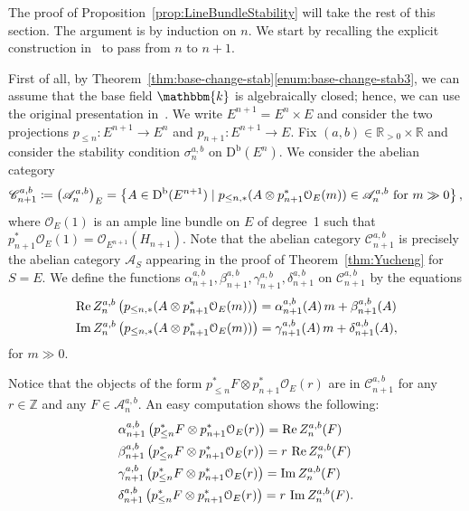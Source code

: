 \documentclass[11pt, reqno]{amsart}
\numberwithin{equation}{section}
\theoremstyle{plain}
\theoremstyle{remark}
\theoremstyle{definition}
\theoremstyle{italicsname}
\newcommand{\st}{\mid}
\def\Re{\mathop{\rm Re}\nolimits}
\def\Im{\mathop{\rm Im}\nolimits}
\newcommand{\Db}{\mathrm{D^b}}
\newcommand{\cO}{\mathcal{O}}
\newcommand{\cA}{\mathscr{A}}
\newcommand{\cC}{\mathscr{C}}
\newcommand{\KK}{\mathbbm{k}}
\def\RR{\ensuremath{\mathbb{R}}}
\def\ZZ{\ensuremath{\mathbb{Z}}}
\begin{document}
The proof of Proposition~\ref{prop:LineBundleStability} will take the rest of this section.
The argument is by induction on $n$.
We start by recalling the explicit construction in~\cite{Liu:StabProd} to pass from $n$ to $n+1$.

First of all, by Theorem~\ref{thm:base-change-stab}\ref{enum:base-change-stab3}, we can assume that the base field $\KK$ is algebraically closed; hence, we can use the original presentation in~\cite{Liu:StabProd}.
We write $E^{n+1}=E^n\times E$ and consider the two projections $p_{\leq n}\colon E^{n+1}\to E^{n}$ and $p_{n+1}\colon E^{n+1}\to E$.
Fix $(a,b)\in\RR_{>0}\times\RR$ and consider the stability condition $\sigma_n^{a,b}$ on $\Db(E^n)$.
We consider the abelian category
\[
\cC^{a,b}_{n+1}\coloneqq\left(\cA_n^{a,b}\right)_E=\left\{A\in\Db(E^{n+1})\st p_{\leq n,*}(A\otimes p_{n+1}^*\cO_E(m))\in\cA^{a,b}_n\textup{ for }m\gg0\right\},
\]
where $\cO_E(1)$ is an ample line bundle on $E$ of degree~1 such that $p_{n+1}^*\cO_E(1)=\cO_{E^{n+1}}(H_{n+1})$. Note that the abelian category $\cC^{a,b}_{n+1}$ is precisely the abelian category $\cA_S$ appearing in the proof of Theorem~\ref{thm:Yucheng} for $S=E$.
We define the functions $\alpha^{a,b}_{n+1},\beta^{a,b}_{n+1},\gamma^{a,b}_{n+1},\delta^{a,b}_{n+1}$ on $\cC^{a,b}_{n+1}$ by the equations
\[
\begin{split}
&\Re Z^{a,b}_n\left(p_{\leq n,*}(A\otimes p_{n+1}^*\cO_E(m))\right)=\alpha^{a,b}_{n+1}(A)\,m+\beta^{a,b}_{n+1}(A)\\
&\Im Z^{a,b}_n\left(p_{\leq n,*}(A\otimes p_{n+1}^*\cO_E(m))\right)= \gamma^{a,b}_{n+1}(A)\, m+\delta^{a,b}_{n+1}(A),
\end{split}
\]
for $m\gg0$.

Notice that the objects of the form $p_{\leq n}^*F\otimes p_{n+1}^*\cO_E(r)$ are in $\cC^{a,b}_{n+1}$ for any $r\in\ZZ$ and any $F\in\cA_n^{a,b}$.
An easy computation shows the following:
\begin{equation}\label{eq:PositivityZParis2}
\begin{split}
	&\alpha^{a,b}_{n+1}\left(p_{\leq n}^*F\otimes p_{n+1}^*\cO_E(r)\right)=\Re Z^{a,b}_n(F)\\
	&\beta^{a,b}_{n+1}\left(p_{\leq n}^*F\otimes p_{n+1}^*\cO_E(r)\right)=r\, \Re Z^{a,b}_n(F)\\
	&\gamma^{a,b}_{n+1}\left(p_{\leq n}^*F\otimes p_{n+1}^*\cO_E(r)\right)=\Im Z^{a,b}_n(F)\\
	&\delta^{a,b}_{n+1}\left(p_{\leq n}^*F\otimes p_{n+1}^*\cO_E(r)\right)=r\,\Im Z^{a,b}_n(F).
\end{split}    
\end{equation}
\end{document}

